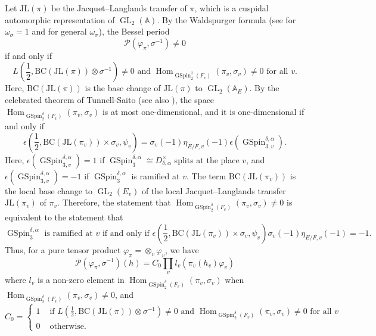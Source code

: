 \documentclass[12pt]{amsart}
\newcommand{\A}{\mathbb{A}}
\newcommand{\Hom}{\operatorname{Hom}}
\newcommand{\JL}{\mathrm{JL}}
\newcommand{\BC}{\mathrm{BC}}
\theoremstyle{remark}
\DeclareMathOperator{\GL}{GL}
\DeclareMathOperator{\GSpin}{GSpin}
\begin{document}
Let $\JL(\pi)$ be the Jacquet--Langlands transfer of $\pi$, which is a cuspidal automorphic representation of $\GL_2(\A)$.
 By the Waldspurger formula (see \cite[Theorem 2]{Waldspurger1985} for $\omega_\sigma=1$ and \cite[Theorem 1.4]{YuanZhangZhang2013} for general $\omega_\sigma$), the Bessel period
\begin{equation*}
		\mathcal{P}(\varphi_\pi, \sigma^{-1}) \not=0
\end{equation*}
if and only if
\begin{equation*}
L(\frac{1}{2}, \BC(\JL(\pi))\otimes\sigma^{-1})\not=0 \text{ and } \Hom_{\GSpin_2^{\delta}(F_v)} (\pi_v,\sigma_v)\not=0 \text{ for all }v.	
\end{equation*}
Here, $\BC(\JL(\pi))$ is the base change of $\JL(\pi)$ to $\GL_2(\mathbb{A}_E)$. 
By the celebrated theorem of Tunnell-Saito \cite{Tunnell1983, Saito1993} (see also \cite[Theorem 1.3]{YuanZhangZhang2013}), the space $\Hom_{\GSpin_2^{\delta}(F_v)} (\pi_v,\sigma_v)$ is at most one-dimensional, and it is one-dimensional if and only if 
\begin{equation*}
\epsilon(\frac{1}{2}, \BC( \JL(\pi_v))\times \sigma_v, \psi_v) = \sigma_v(-1) \eta_{E/F,v}(-1) \epsilon( \GSpin_{3,v}^{\delta,\alpha}).	
\end{equation*}
Here, $\epsilon( \GSpin_{3,v}^{\delta,\alpha})=1$ if $\GSpin_{3}^{\delta,\alpha}\cong D_{\delta,\alpha}^{\times}$ splits at the place $v$, and $\epsilon( \GSpin_{3,v}^{\delta,\alpha})=-1$ if $\GSpin_{3}^{\delta,\alpha}$ is ramified at $v$. The term $\BC(\JL(\pi_v))$ is the local base change to $\GL_2(E_v)$ of the local Jacquet--Langlands transfer $\JL(\pi_v)$ of $\pi_v$.
 Therefore, the statement that $\Hom_{\GSpin_2^{\delta}(F_v)} (\pi_v,\sigma_v)\not=0$ is equivalent to the statement that 
\begin{equation*}
\GSpin_3^{\delta, \alpha} \text{ is ramified at $v$ if and only if } \epsilon(\frac{1}{2}, \BC( \JL(\pi_v))\times \sigma_v, \psi_v) \sigma_v(-1) \eta_{E/F,v}(-1)=-1.  
\end{equation*}
Thus, for a pure tensor product $\varphi_\pi=\otimes_v \varphi_{v}$, we have
\begin{equation}
\label{eq-JL-eq3}
	\mathcal{P}(\varphi_\pi, \sigma^{-1})(h)= 
	C_0 \prod_{v} l_v (\pi_v(h_v) \varphi_{v})
\end{equation}
where $l_v$ is a non-zero element in $\Hom_{\GSpin_2^{\delta}(F_v)} (\pi_v,\sigma_v)$ when $\Hom_{\GSpin_2^{\delta}(F_v)} (\pi_v,\sigma_v)\not=0$, and 
\begin{equation*}
C_0=\begin{cases}
1 & \text{ if }   L(\frac{1}{2}, \BC(\JL(\pi))\otimes\sigma^{-1})\not=0 \text{ and } \Hom_{\GSpin_2^{\delta}(F_v)} (\pi_v,\sigma_v)\not=0 \text{ for all }v \\
0 &  \text{ otherwise}.
\end{cases}
\end{equation*}
\end{document}
